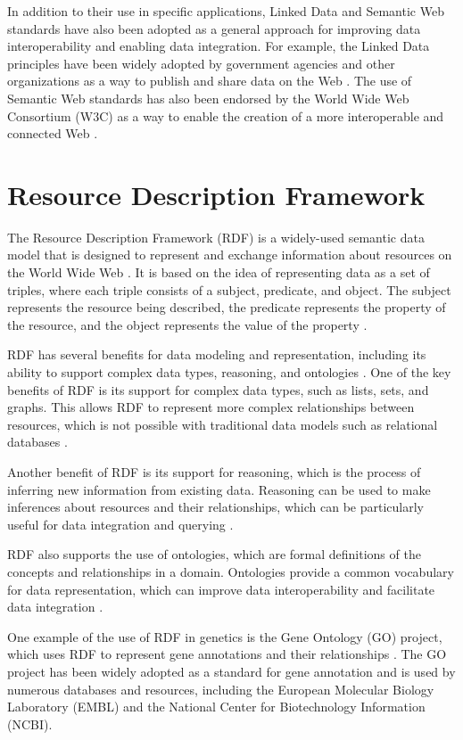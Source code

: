 In addition to their use in specific applications, Linked Data and Semantic Web standards have also been adopted as a general approach for improving data interoperability and enabling data integration.  For example, the Linked Data principles have been widely adopted by government agencies and other organizations as a way to publish and share data on the Web \citep{bizer2011linkedData}.  The use of Semantic Web standards has also been endorsed by the World Wide Web Consortium (W3C) as a way to enable the creation of a more interoperable and connected Web \citep{shadbolt2006semantic}.

\section{Resource Description Framework}
The Resource Description Framework (RDF) is a widely-used semantic data model that is designed to represent and exchange information about resources on the World Wide Web \citep{schreiber2014rdf}.  It is based on the idea of representing data as a set of triples, where each triple consists of a subject, predicate, and object.  The subject represents the resource being described, the predicate represents the property of the resource, and the object represents the value of the property \citep{schreiber2014rdf}.

RDF has several benefits for data modeling and representation, including its ability to support complex data types, reasoning, and ontologies \citep{schreiber2014rdf}.  One of the key benefits of RDF is its support for complex data types, such as lists, sets, and graphs.  This allows RDF to represent more complex relationships between resources, which is not possible with traditional data models such as relational databases \citep{allemang2011semantic}.

Another benefit of RDF is its support for reasoning, which is the process of inferring new information from existing data.  Reasoning can be used to make inferences about resources and their relationships, which can be particularly useful for data integration and querying \citep{allemang2011semantic}.

RDF also supports the use of ontologies, which are formal definitions of the concepts and relationships in a domain.  Ontologies provide a common vocabulary for data representation, which can improve data interoperability and facilitate data integration \citep{heath2011linked}.

One example of the use of RDF in genetics is the Gene Ontology (GO) project, which uses RDF to represent gene annotations and their relationships \citep{gene2004gene}.  The GO project has been widely adopted as a standard for gene annotation and is used by numerous databases and resources, including the European Molecular Biology Laboratory (EMBL) and the National Center for Biotechnology Information (NCBI).

